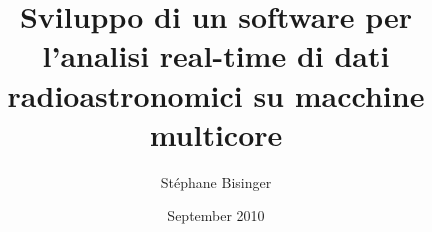 \documentclass[a4paper,11pt,twoside,openright]{unibo}
\begin{document}
\title{Sviluppo di un software per l'analisi real-time di dati
radioastronomici su macchine multicore}
\author{St\'ephane Bisinger}
\date{September 2010}

\maketitle
%

\tableofcontents
\listoffigures
\lstlistoflistings











\end{document}
